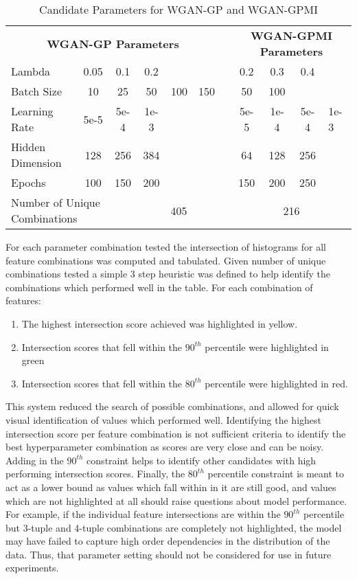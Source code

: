 \begin{table}[!htbp]
	\centering
	\caption{Candidate Parameters for WGAN-GP and WGAN-GPMI}
	\label{tab:param_sweep}
	\begin{tabular}{l|ccccc|l|cccl}
		\cline{1-11}
		\multicolumn{6}{c}{\textbf{WGAN-GP Parameters}} & \multicolumn{1}{l}{} & \multicolumn{4}{c}{\textbf{WGAN-GPMI Parameters}} \\
		\cline{1-11}
		Lambda & 0.05 & 0.1 & 0.2 & & & & 0.2 & 0.3 & 0.4 & \\
		Batch Size & 10 & 25 & 50 & 100 & 150 & & 50 & 100 &  & \\
		Learning Rate & 5e-5 & 5e-4 & 1e-3 & & & & 5e-5 & 1e-4 & 5e-4 & 1e-3 \\
		Hidden Dimension & 128 & 256 & 384 & & & & 64 & 128 & 256 & \\
		Epochs & 100 & 150 & 200 & & & & 150 & 200 & 250 & \\
		\cline{1-11}
		\multicolumn{3}{l|}{Number of Unique Combinations} & \multicolumn{3}{c}{405} & \multicolumn{1}{|l|}{} & \multicolumn{4}{c}{216} \\ \cline{1-11}
	\end{tabular}
\end{table}

For each parameter combination tested the intersection of histograms for all feature combinations was computed and tabulated. Given number of unique combinations tested a simple 3 step heuristic was defined to help identify the combinations which performed well in the table. For each combination of features:

\begin{enumerate}
	\item The highest intersection score achieved was highlighted in yellow.
	\item Intersection scores that fell within the $90^{th}$ percentile were highlighted in green
	\item Intersection scores that fell within the $80^{th}$ percentile were highlighted in red.
\end{enumerate}

This system reduced the search of possible combinations, and allowed for quick visual identification of values which performed well. Identifying the highest intersection score per feature combination is not sufficient criteria to identify the best hyperparameter combination as scores are very close and can be noisy. Adding in the $90^{th}$ constraint helps to identify other candidates with high performing intersection scores. Finally, the $80^{th}$ percentile constraint is meant to act as a lower bound as values which fall within in it are still good, and values which are not highlighted at all should raise questions about model performance. For example, if the individual feature intersections are within the $90^{th}$ percentile but 3-tuple and 4-tuple combinations are completely not highlighted, the model may have failed to capture high order dependencies in the distribution of the data. Thus, that parameter setting should not be considered for use in future experiments.

